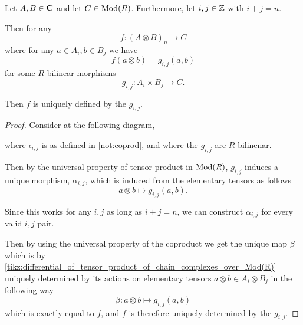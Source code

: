 \begin{lemma}
    \label{lem:map_out_of_tensor_unique}
    Let \( A, B \in \operatorname{\mathbf{C}} \) and let \( C \in \operatorname{Mod}(R) \). Furthermore, let \( i, j \in {\mathbb{Z}} \) with \( i + j = n \).

    Then for any
    \[
        f: (A \otimes B)_n \to C
    \]
    where for any \( a \in A_i, b \in B_j \) we have
    \[
        f(a \otimes b) = g_{i, j}(a, b)
    \]
    for some \( R \)-bilinear morphisms
    \[
        g_{i, j}: A_i \times B_j \to C.
    \]

    Then \( f \) is uniquely defined by the \( g_{i, j} \).
\end{lemma}
\begin{proof}
    Consider at the following diagram,
    \begin{diagramlabel}[\label{tikz:differential_of_tensor_product_of_chain_complexes_over_Mod(R)}]
    \end{diagramlabel}
    where \( \iota_{i, j} \) is as defined in \autoref{not:coprod}, and where the \( g_{i, j} \) are \( R \)-bilinenar.

    Then by the universal property of tensor product in \( \operatorname{Mod}(R) \), \( g_{i, j} \) induces a unique morphism, \( \alpha_{i, j} \), which is induced from the elementary tensors as follows
    \[
        a \otimes b \mapsto g_{i, j}(a, b).
    \]

    Since this works for any \( i, j \) as long as \( i + j = n \), we can construct \( \alpha_{i, j} \) for every valid \( i, j \) pair.

    Then by using the universal property of the coproduct we get the unique map \( \beta \) which is by \autoref{tikz:differential_of_tensor_product_of_chain_complexes_over_Mod(R)} uniquely determined by its actions on elementary tensors \( a \otimes b \in A_i \otimes B_j \) in the following way
    \[
        \beta: a \otimes b \mapsto g_{i, j}(a, b)
    \]
    which is exactly equal to \( f \), and \( f \) is therefore uniquely determined by the \( g_{i, j} \).
\end{proof}

